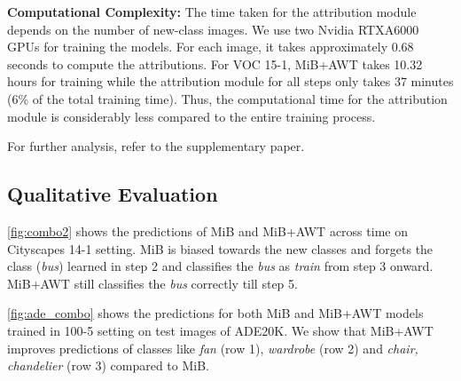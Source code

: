 \noindent\textbf{Computational Complexity:} The time taken for the attribution module depends on the number of new-class images. We use two Nvidia RTXA6000 GPUs for training the models. For each image, it takes approximately 0.68 seconds to compute the attributions.
For VOC 15-1, MiB+AWT takes 10.32 hours for training while the attribution module for all steps only takes 37 minutes (6\% of the total training time). Thus, the computational time for the attribution module is considerably less compared to the entire training process.

For further analysis, refer to the supplementary paper.

\subsection{Qualitative Evaluation}
\cref{fig:combo2} shows the predictions of MiB and MiB+AWT across time on Cityscapes 14-1 setting. MiB is biased towards the new classes and forgets the class (\emph{bus}) learned in step 2 and classifies the \emph{bus} as \emph{train} from step 3 onward. MiB+AWT still classifies the \emph{bus} correctly till step 5.

\cref{fig:ade_combo} shows the predictions for both MiB and MiB+AWT models trained in 100-5 setting on test images of ADE20K. We show that MiB+AWT improves predictions of classes like \emph{fan} (row 1), \emph{wardrobe} (row 2) and \emph{chair, chandelier} (row 3) compared to MiB.

\adecombo{}